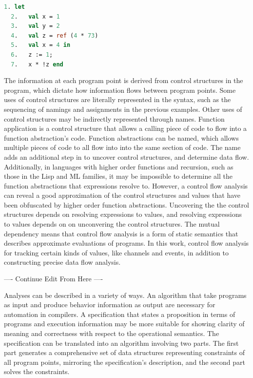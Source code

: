 \documentclass{article}
\begin{document}
\begin{lstlisting}[language=ML, escapechar=\%]
  1. let 
  2.   val x = 1  
  3.   val y = 2
  4.   val z = ref (4 * 73)
  5.   val x = 4 in 
  6.   z := 1; 
  7.   x * !z end
  \end{lstlisting}

The information at each program point is derived from control structures in the program, which
dictate how information flows between program points. Some uses of control structures are
literally represented in the syntax, such as the sequencing of namings and assignments in the
previous examples. Other uses of control structures may be indirectly represented through
names. Function application is a control structure that allows a calling piece of code to
flow into a function abstraction's code.  Function abstractions can be named, which allows
multiple pieces of code to all flow into into the same section of code. The name adds an
additional step in to uncover control structures, and determine data flow.
Additionally, in languages with higher order functions and recursion, such as those in the Lisp
and ML families, it may be impossible to determine all the function abstractions that
expressions resolve to. However, a control flow analysis can reveal a good
approximation of the control structures and values that have been obfuscated by higher order
function abstractions.  Uncovering the the control structures depends on resolving expressions
to values, and resolving expressions to values depends on on unconvering the control
structures. The mutual dependency means that control flow analysis is a form of
static semantics that describes approximate evaluations of programs. In this work, control flow
analysis for tracking certain kinds of values, like channels and events, in addition to
constructing precise data flow analysis. 

---- Continue Edit From Here ----

Analyses can be described in a variety of ways.  An algorithm that take programs as input and
produce behavior information as output are necessary for automation in compilers.  A
specification that states a proposition in terms of programs and execution information may be
more suitable for showing clarity of meaning and correctness with respect to the operational
semantics.  The specification can be translated into an algorithm involving two parts.  The
first part generates a comprehensive set of data structures representing constraints of all
program points, mirroring the specification's description, and the second part solves the
constraints.
\end{document}
